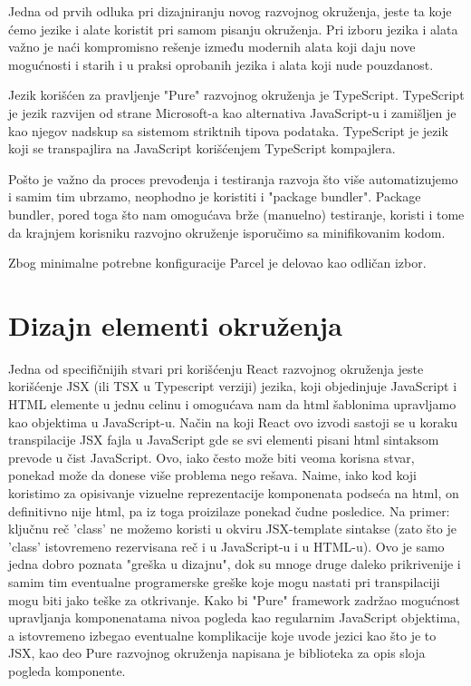 \documentclass[12pt,oneside]{memoir}
\begin{document}
Jedna od prvih odluka pri dizajniranju novog razvojnog okruženja,
jeste ta koje ćemo jezike i alate koristit pri samom pisanju okruženja.
Pri izboru jezika i alata važno je naći kompromisno rešenje između modernih
alata koji daju nove mogućnosti i
starih i u praksi oprobanih jezika i alata koji nude pouzdanost.

Jezik korišćen za pravljenje "Pure" razvojnog okruženja je TypeScript. TypeScript je
jezik razvijen od strane Microsoft-a kao alternativa JavaScript-u i zamišljen je kao njegov nadskup sa sistemom striktnih tipova podataka.
TypeScript je jezik koji se transpajlira na JavaScript korišćenjem TypeScript kompajlera.

Pošto je važno da proces prevođenja i testiranja razvoja što više automatizujemo i samim tim ubrzamo, neophodno je koristiti i "package bundler". 
Package bundler, pored toga što nam omogućava brže (manuelno) testiranje, koristi i tome da krajnjem korisniku razvojno okruženje isporučimo sa minifikovanim kodom.

Zbog minimalne potrebne konfiguracije Parcel je delovao kao odličan izbor.

\section{Dizajn elementi okruženja}
Jedna od specifičnijih stvari pri korišćenju React razvojnog okruženja jeste korišćenje JSX (ili TSX u Typescript verziji) jezika, koji objedinjuje JavaScript i HTML elemente u jednu
celinu i omogućava nam da html šablonima upravljamo kao objektima u JavaScript-u. Način na koji React ovo izvodi sastoji se u koraku transpilacije JSX fajla u JavaScript gde se svi elementi pisani html sintaksom prevode u čist JavaScript. 
Ovo, iako često može biti veoma korisna stvar, ponekad može da donese više problema nego rešava. Naime, iako kod koji koristimo za opisivanje vizuelne reprezentacije komponenata podseća na html,
on definitivno nije html, pa iz toga proizilaze ponekad čudne posledice. Na primer: ključnu reč 'class' ne možemo koristi u okviru JSX-template sintakse (zato što je 
'class' istovremeno rezervisana reč i u JavaScript-u i u HTML-u). Ovo je samo jedna dobro poznata "greška u dizajnu", dok su mnoge druge daleko prikrivenije i samim tim eventualne programerske greške koje mogu nastati pri transpilaciji mogu biti jako teške za otkrivanje.
Kako bi "Pure" framework zadržao mogućnost upravljanja komponenatama nivoa pogleda kao regularnim JavaScript objektima, a istovremeno izbegao eventualne komplikacije koje uvode jezici kao što je to JSX, kao deo Pure razvojnog okruženja napisana je biblioteka za opis sloja pogleda komponente.
\end{document}
